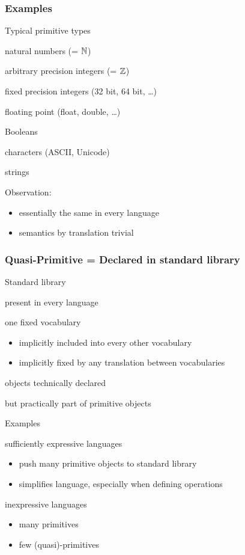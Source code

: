 \begin{frame}\frametitle{Examples}
\begin{blockitems}{Typical primitive types}
 \item natural numbers (= $\mathbb{N}$)
 \item arbitrary precision integers (= $\mathbb{Z}$)
 \item fixed precision integers (32 bit, 64 bit, \ldots)
 \item floating point (float, double, \ldots)
 \item Booleans
 \item characters (ASCII, Unicode)
 \item strings
\end{blockitems}

Observation:
\begin{itemize}
\item essentially the same in every language
\item semantics by translation trivial
\end{itemize}
\end{frame}

\begin{frame}\frametitle{Quasi-Primitive = Declared in standard library}
\begin{blockitems}{Standard library}
 \item present in every language
 \item one fixed vocabulary
  \begin{itemize}
  \item implicitly included into every other vocabulary
  \item implicitly fixed by any translation between vocabularies
  \end{itemize}
 \item objects technically declared
 \item but practically part of primitive objects
\end{blockitems}

\begin{blockitems}{Examples}
\item sufficiently expressive languages
 \begin{itemize}
 \item push many primitive objects to standard library 
 \item simplifies language, especially when defining operations
 \end{itemize}
\item inexpressive languages
\begin{itemize}
\item many primitives 
\item few (quasi)-primitives 
\end{itemize}
\end{blockitems}
\end{frame}

